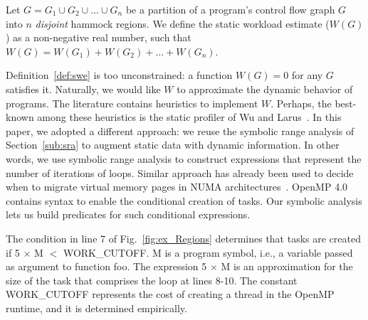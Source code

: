\documentclass[sigplan,10pt,review,anonymous]{acmart}
\begin{document}
\begin{definition}
\label{def:swe}
Let $G = G_1 \cup G_2 \cup \ldots \cup G_n$ be a partition of a program's control
flow graph $G$ into $n$ {\em disjoint} hammock regions.
We define the static workload estimate ($W(G)$) as a non-negative real number,
such that $W(G) = W(G_1) + W(G_2) + \ldots + W(G_n)$.
\end{definition}

Definition~\ref{def:swe} is too unconstrained: a function $W(G) = 0$ for any $G$
satisfies it.
Naturally, we would like $W$ to approximate the 
dynamic behavior of programs.
The literature contains heuristics to implement $W$.
Perhaps, the best-known among these heuristics is the static profiler of
Wu and Larus~\cite{Wu94}.
In this paper, we adopted a different approach: we reuse the symbolic range
analysis of Section~\ref{sub:sra} to augment static data with dynamic information.
In other words, we use symbolic range analysis to construct expressions that
represent the number of iterations of loops.
Similar approach has already been used to decide when to migrate virtual memory
pages in NUMA architectures~\cite{Piccoli14}.
OpenMP 4.0 contains syntax to enable the conditional creation of tasks.
Our symbolic analysis lets us build predicates for such conditional expressions.

\begin{example}
\label{ex:cond_task}
The condition in line 7 of Fig.~\ref{fig:ex_Regions} determines that tasks are
created if \textsf{5 $\times$ M $<$ WORK\_CUTOFF}.
\textsf{M} is a program symbol, i.e., a variable passed as argument to
function \textsf{foo}.
The expression \textsf{5 $\times$ M} is an approximation for the size of the
task that comprises the loop at lines 8-10.
The constant \textsf{WORK\_CUTOFF} represents the cost of creating a thread
in the OpenMP runtime, and it is determined empirically.
\end{example}
\end{document}
